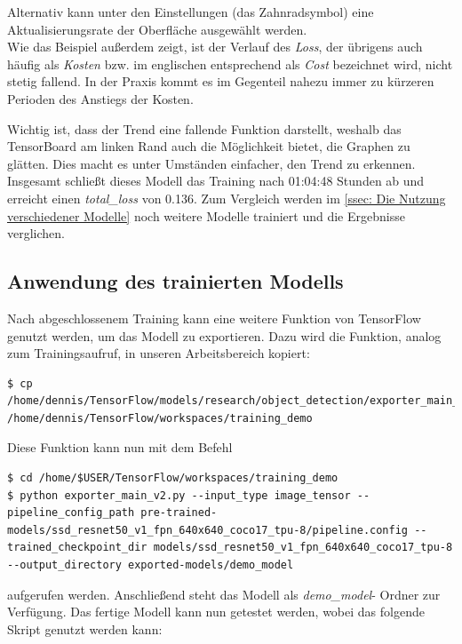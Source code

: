 \documentclass[12pt, oneside]{article}
\begin{document}
Alternativ kann unter den Einstellungen (das Zahnradsymbol) eine Aktualisierungsrate der Oberfläche ausgewählt werden.\\

Wie das Beispiel außerdem zeigt, ist der Verlauf des \textit{Loss}, der übrigens auch häufig als \textit{Kosten} bzw. im englischen entsprechend als \textit{Cost} bezeichnet wird, nicht stetig fallend. In der Praxis kommt es im Gegenteil nahezu immer zu kürzeren Perioden des Anstiegs der Kosten.

Wichtig ist, dass der Trend eine fallende Funktion darstellt, weshalb das TensorBoard am linken Rand auch die Möglichkeit bietet, die Graphen zu glätten. Dies macht es unter Umständen einfacher, den Trend zu erkennen.\\

Insgesamt schließt dieses Modell das Training nach 01:04:48 Stunden ab und erreicht einen \textit{total\_loss} von 0.136. Zum Vergleich werden im \autoref{ssec: Die Nutzung verschiedener Modelle} noch weitere Modelle trainiert und die Ergebnisse verglichen.

\subsection{Anwendung des trainierten Modells} 

Nach abgeschlossenem Training kann eine weitere Funktion von TensorFlow genutzt werden, um das Modell zu exportieren. Dazu wird die Funktion, analog zum Trainingsaufruf, in unseren Arbeitsbereich kopiert:

\begin{verbatim}
$ cp /home/dennis/TensorFlow/models/research/object_detection/exporter_main_v2.py /home/dennis/TensorFlow/workspaces/training_demo
\end{verbatim}    
Diese Funktion kann nun mit dem Befehl    

\begin{verbatim}
$ cd /home/$USER/TensorFlow/workspaces/training_demo
$ python exporter_main_v2.py --input_type image_tensor --pipeline_config_path pre-trained-models/ssd_resnet50_v1_fpn_640x640_coco17_tpu-8/pipeline.config --trained_checkpoint_dir models/ssd_resnet50_v1_fpn_640x640_coco17_tpu-8 --output_directory exported-models/demo_model
\end{verbatim}
aufgerufen werden. Anschließend steht das Modell als \textit{demo\_model}- Ordner zur Verfügung. Das fertige Modell kann nun getestet werden, wobei das folgende Skript genutzt werden kann:
\end{document}
